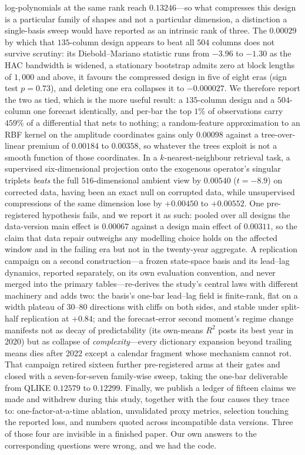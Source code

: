log-polynomials at the same rank reach $0.13246$---so what compresses this design is a particular family of shapes and not a particular dimension, a distinction a single-basis sweep would have reported as an intrinsic rank of three. The $0.00029$ by which that $135$-column design appears to beat all $504$ columns does not survive scrutiny: its Diebold--Mariano statistic runs from $-3.96$ to $-1.30$ as the HAC bandwidth is widened, a stationary bootstrap admits zero at block lengths of $1{,}000$ and above, it favours the compressed design in five of eight eras (sign test $p = 0.73$), and deleting one era collapses it to $-0.000027$. We therefore report the two as tied, which is the more useful result: a $135$-column design and a $504$-column one forecast identically, and per-bar the top $1\%$ of observations carry $459\%$ of a differential that nets to nothing; a random-feature approximation to an RBF kernel on the amplitude coordinates gains only $0.00098$ against a tree-over-linear premium of $0.00184$ to $0.00358$, so whatever the trees exploit is not a smooth function of those coordinates. In a $k$-nearest-neighbour retrieval task, a supervised six-dimensional projection onto the exogenous operator's singular triplets \emph{beats} the full $516$-dimensional ambient view by $0.00540$ ($t = -8.9$) on corrected data, having been an exact null on corrupted data, while unsupervised compressions of the same dimension lose by $+0.00450$ to $+0.00552$. One pre-registered hypothesis fails, and we report it as such: pooled over all designs the data-version main effect is $0.00067$ against a design main effect of $0.00311$, so the claim that data repair outweighs any modelling choice holds on the affected window and in the failing era but not in the twenty-year aggregate. A replication campaign on a second construction---a frozen state-space basis and its lead--lag dynamics, reported separately, on its own evaluation convention, and never merged into the primary tables---re-derives the study's central laws with different machinery and adds two: the basis's one-bar lead--lag field is finite-rank, flat on a width plateau of 30--80 directions with cliffs on both sides, and stable under split-half replication at $+0.84$; and the forecast-error second moment's regime change manifests not as decay of predictability (its own-means $R^2$ posts its best year in 2020) but as collapse of \emph{complexity}---every dictionary expansion beyond trailing means dies after 2022 except a calendar fragment whose mechanism cannot rot. That campaign retired sixteen further pre-registered arms at their gates and closed with a seven-for-seven family-wise sweep, taking the one-bar deliverable from QLIKE $0.12579$ to $0.12299$. Finally, we publish a ledger of fifteen claims we made and withdrew during this study, together with the four causes they trace to: one-factor-at-a-time ablation, unvalidated proxy metrics, selection touching the reported loss, and numbers quoted across incompatible data versions. Three of those four are invisible in a finished paper. Our own answers to the corresponding questions were wrong, and we had the code.
